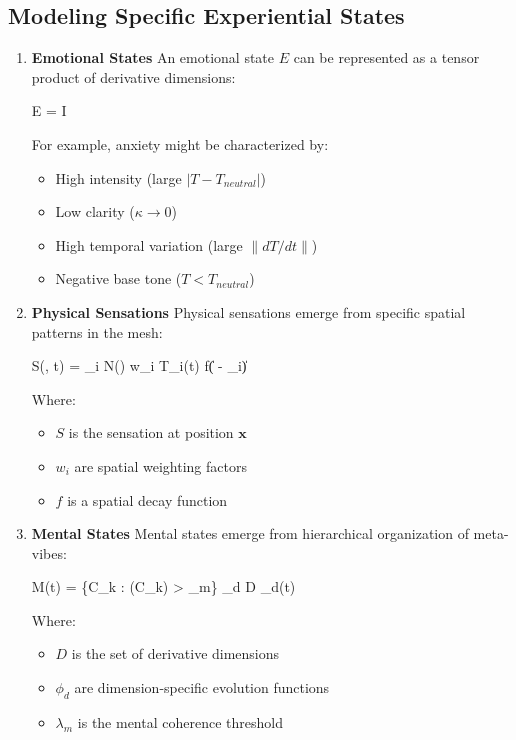 \documentclass{article}
\let\oldequation\equation
\let\endoldequation\endequation
\renewenvironment{equation}{%
    \noindent\vspace{-\parskip}\vspace{-\baselineskip}%
    \oldequation
}{%
    \endoldequation
    \noindent\vspace{-\parskip}\vspace{-\baselineskip}%
}
\theoremstyle{definition}
\theoremstyle{axiom}
\theoremstyle{theorem}
\theoremstyle{lemma}
\theoremstyle{proposition}
\begin{document}
\subsection{Modeling Specific Experiential States}

\begin{enumerate}
\item \textbf{Emotional States} An emotional state $E$ can be represented as a tensor product of derivative dimensions:

\begin{equation}
E = I \otimes \kappa \otimes \Xi \otimes {}
\end{equation}

For example, anxiety might be characterized by:
\begin{itemize}
\item High intensity (large $|T - T_{neutral}|$)
\item Low clarity ($\kappa \to 0$)
\item High temporal variation (large $\|dT/dt\|$)
\item Negative base tone ($T < T_{neutral}$)
\end{itemize}

\item \textbf{Physical Sensations} Physical sensations emerge from specific spatial patterns in the mesh:

\begin{equation}
S(, t) = \sum_{i \in N()} w_i T_i(t) f(\| - _i\|)
\end{equation}

Where:
\begin{itemize}
\item $S$ is the sensation at position $\mathbf{x}$
\item $w_i$ are spatial weighting factors
\item $f$ is a spatial decay function
\end{itemize}

\item \textbf{Mental States} Mental states emerge from hierarchical organization of meta-vibes:

\begin{equation}
M(t) = \{C_k : (C_k) > \lambda_m\} \times \prod_{d \in D} \phi_d(t)
\end{equation}

Where:
\begin{itemize}
\item $D$ is the set of derivative dimensions
\item $\phi_d$ are dimension-specific evolution functions
\item $\lambda_m$ is the mental coherence threshold
\end{itemize}
\end{enumerate}
\end{document}
